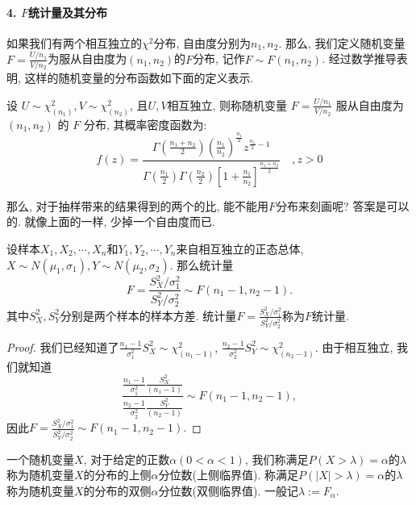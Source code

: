 \paragraph{4. $F$统计量及其分布} 如果我们有两个相互独立的$\chi^2$分布, 自由度分别为$n_1, n_2$. 那么, 我们定义随机变量$F=\frac{U/n_1}{V/n_2}$为服从自由度为$(n_1, n_2)$的$F$分布, 记作$F\sim F(n_1, n_2)$. 经过数学推导表明, 这样的随机变量的分布函数如下面的定义表示. 

\begin{definition}
    设 $U \sim \chi^2_{\left(n_1\right)}, V \sim \chi^2_{\left(n_2\right)}$, 且$U,V$相互独立, 则称随机变量 $F=\frac{U / n_1}{V / n_2}$ 服从自由度为 $\left(n_1, n_2\right)$ 的 ${F}$ 分布, 其概率密度函数为:
$$
f(z)=\frac{\Gamma\left(\frac{n_1+n_2}{2}\right)\left(\frac{n_1}{n_2}\right)^{\frac{n_1}{2}} z^{\frac{n_1}{2}-1}}{\Gamma\left(\frac{n_1}{2}\right) \Gamma\left(\frac{n_2}{2}\right)\left[1+\frac{n_1 }{n_2}\right]^{\frac{n_1+n_2}{2}}} \quad ,z>0
$$
\end{definition}

那么, 对于抽样带来的结果得到的两个的比, 能不能用$F$分布来刻画呢? 答案是可以的. 就像上面的一样, 少掉一个自由度而已. 

\begin{corollary}
    设样本$X_1, X_2,\cdots, X_n$和$Y_1, Y_2, \cdots, Y_n$来自相互独立的正态总体, $X\sim N(\mu_1, \sigma_1), Y\sim N(\mu_2, \sigma_2)$. 那么统计量
    \[
        F=\frac{S_X^2/\sigma_1^2}{S_Y^2/\sigma_2^2} \sim F(n_1-1, n_2-1).
    \]
    其中$S_X^2, S_Y^2$分别是两个样本的样本方差. 统计量$F=\frac{S_X^2/\sigma_1^2}{S_Y^2/\sigma_2^2}$称为$F$统计量. 
\end{corollary}

\begin{proof}
    我们已经知道了$\frac{n_1-1}{\sigma_1^2}S_X^2\sim \chi^2_{(n_1-1)}$, $\frac{n_2-1}{\sigma_2^2}S_Y^2\sim \chi^2_{(n_2-1)}$. 由于相互独立, 我们就知道
    \[
        \frac{
            \frac{
                n_1-1
            }{\sigma_1^2}
            \frac{S_X^2}{(n_1-1)}
        }{
            \frac{
                n_2-1
            }{\sigma_2^2}
            \frac{
                S_Y^2
            }{(n_2-1)}
        }\sim F(n_1-1, n_2-1),  
    \]
    因此$ F=\frac{S_X^2/\sigma_1^2}{S_Y^2/\sigma_2^2} \sim F(n_1-1, n_2-1).$
\end{proof}


\begin{definition}[分位数]
    一个随机变量$X$, 对于给定的正数$\alpha(0< \alpha<1 )$, 我们称满足$P(X>\lambda)=\alpha$的$\lambda$称为随机变量$X$的分布的上侧$\alpha$分位数(上侧临界值). 称满足$P(|X|>\lambda)=\alpha$的$\lambda$称为随机变量$X$的分布的双侧$\alpha$分位数(双侧临界值). 一般记$\lambda:=F_{\alpha}$. 
\end{definition}

